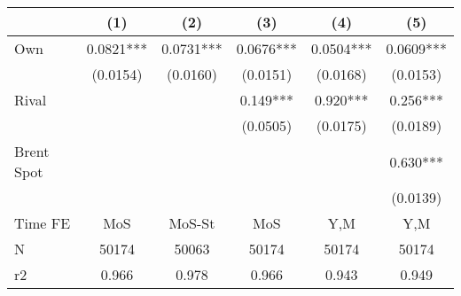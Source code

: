 {
\def\sym#1{\ifmmode^{#1}\else\(^{#1}\)\fi}
\begin{tabular}{l*{5}{c}}
\toprule
                &\multicolumn{1}{c}{(1)}   &\multicolumn{1}{c}{(2)}   &\multicolumn{1}{c}{(3)}   &\multicolumn{1}{c}{(4)}   &\multicolumn{1}{c}{(5)}   \\
\midrule
Own             &   0.0821***&   0.0731***&   0.0676***&   0.0504***&   0.0609***\\
                & (0.0154)   & (0.0160)   & (0.0151)   & (0.0168)   & (0.0153)   \\
\addlinespace
Rival           &            &            &    0.149***&    0.920***&    0.256***\\
                &            &            & (0.0505)   & (0.0175)   & (0.0189)   \\
\addlinespace
Brent Spot      &            &            &            &            &    0.630***\\
                &            &            &            &            & (0.0139)   \\
\midrule
Time FE         &      MoS   &   MoS-St   &      MoS   &      Y,M   &      Y,M   \\
N               &    50174   &    50063   &    50174   &    50174   &    50174   \\
r2              &    0.966   &    0.978   &    0.966   &    0.943   &    0.949   \\
\bottomrule
\end{tabular}
}
